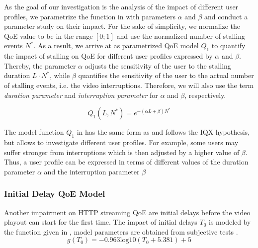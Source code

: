 As the goal of our investigation is the analysis of the impact of different user profiles, we parametrize the function in  with parameters \(\alpha\) and \(\beta\) and conduct a parameter study on their impact. 
For the sake of simplicity, we normalize the QoE value to be in the range \(\left[0;1\right]\)  and use the normalized number of stalling events $N^*$. 
As a result, we arrive at  as parametrized \gls{QoE} model \(Q_1\) to quantify the impact of stalling on QoE for different user profiles expressed by \(\alpha\) and \(\beta\). 
Thereby, the parameter \(\alpha\) adjusts the sensitivity of the user to the stalling duration \(L\cdot N^*\), while \(\beta\) quantifies the sensitivity of the user to the actual number of stalling events, i.e. the video interruptions.
Therefore, we will also use the term \emph{duration parameter} and \emph{interruption parameter} for \(\alpha\) and \(\beta\), respectively.

\begin{equation}
   Q_1(L,N^*) = e^{-\left( \alpha L + \beta\right) N^*} 
\label{eq:application:qoe_user_behaviour:typical_user_scenarios:youtube_qoe:stalling:parameterized_model}
\end{equation}

The model function \(Q_1\) in  has the same form as  and follows the IQX hypothesis, but allows to investigate different user profiles.
For example, some users may suffer stronger from interruptions which is then adjusted by a higher value of \(\beta\).
Thus, a user profile can be expressed in terms of different values of the duration parameter \(\alpha\) and the interruption parameter \(\beta\)

\subsubsection*{Initial Delay QoE Model}\label{sec:application:qoe_user_behaviour:typical_user_scenarios:initial_delay}
Another impairment on \gls{HTTP} streaming \gls{QoE} are initial delays before the video playout can start for the first time.
The impact of initial delays \(T_0\) is modeled by the function given in , model parameters are obtained from subjective tests \cite{Hossfeld2012c}. 
\begin{equation}
g(T_0)=-0.963 \mathrm{log10}(T_0 + 5.381) + 5
\label{eq:application:qoe_user_behaviour:typical_user_scenarios:initial_delay:original_model}
\end{equation}

